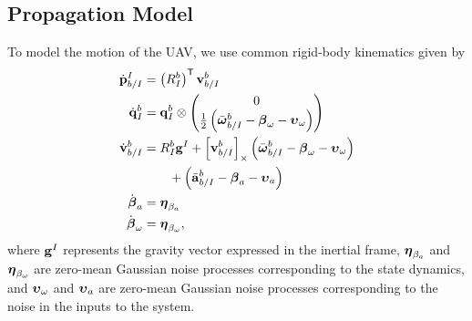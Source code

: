 
\subsection{Propagation Model}
To model the motion of the UAV, we use common rigid-body kinematics given by
\begin{align}
  \dot{\vect{p}}_{b/I}^I
  &=
  \left( R_I^b \right)^\transpose \vect{v}_{b/I}^b
  \label{eq:uav_dynamics}
  \\
  \dot{\vect{q}}_{I}^{b} 
	&= 	
  \q_I^b \otimes \begin{pmatrix} 0 \\ \frac{1}{2}
    \left( \bar{\vect{\omega}}_{b/I}^b - \vect{\beta}_\omega - \vect{\upsilon}_\omega \right)
\end{pmatrix} \nonumber \\
  \dot{\vect{v}}_{b/I}^b 
  &=
  R_I^b \vect{g}^I
  +
  \skewmat{\vect{v}_{b/I}^b}
  \left( \bar{\vect{\omega}}_{b/I}^b - \vect{\beta}_\omega -
  \vect{\upsilon}_\omega \right) \nonumber \\
  & \qquad +
  \left( \bar{\vect{a}}_{b/I}^b - \vect{\beta}_a - \vect{\upsilon}_a \right) \nonumber
  \\
  \dot{\vect{\beta}}_a &= \vect{\eta}_{\beta_a} \nonumber
  \\
  \dot{\vect{\beta}}_\omega &= \vect{\eta}_{\beta_\omega}, \nonumber
\end{align}
where $\boldsymbol{\mathrm{g}}^I$ represents the gravity vector expressed in the inertial
frame, $\boldsymbol{\mathrm{\eta}}_{\beta_a}$ and $\boldsymbol{\mathrm{\eta}}_{\beta_\omega}$ are zero-mean
Gaussian noise processes corresponding to the state dynamics, and
$\boldsymbol{\mathrm{\upsilon}}_\omega$ and $\boldsymbol{\mathrm{\upsilon}}_a$ are zero-mean Gaussian noise
processes corresponding to the noise in the inputs to the system.

